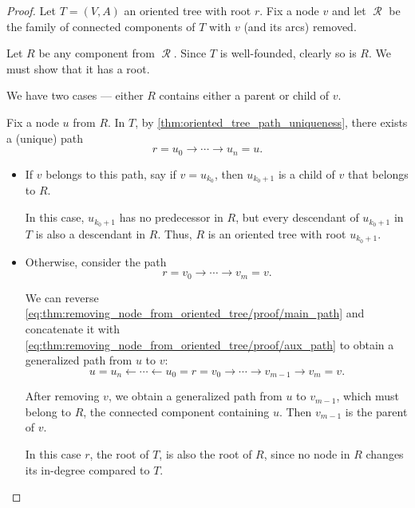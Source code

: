 \begin{proof}
  Let \( T = (V, A) \) an oriented tree with root \( r \). Fix a node \( v \) and let \( \mscrR \) be the family of connected components of \( T \) with \( v \) (and its arcs) removed.

  Let \( R \) be any component from \( \mscrR \). Since \( T \) is well-founded, clearly so is \( R \). We must show that it has a root.

  We have two cases --- either \( R \) contains either a parent or child of \( v \).

  Fix a node \( u \) from \( R \). In \( T \), by \cref{thm:oriented_tree_path_uniqueness}, there exists a (unique) path
  \begin{equation}\label{eq:thm:removing_node_from_oriented_tree/proof/main_path}
    r = u_0 \to \cdots \to u_n = u.
  \end{equation}

  \begin{itemize}
    \item If \( v \) belongs to this path, say if \( v = u_{k_0} \), then \( u_{k_0+1} \) is a child of \( v \) that belongs to \( R \).

    In this case, \( u_{k_0+1} \) has no predecessor in \( R \), but every descendant of \( u_{k_0+1} \) in \( T \) is also a descendant in \( R \). Thus, \( R \) is an oriented tree with root \( u_{k_0+1} \).

    \item Otherwise, consider the path
    \begin{equation}\label{eq:thm:removing_node_from_oriented_tree/proof/aux_path}
      r = v_0 \to \cdots \to v_m = v.
    \end{equation}

    We can reverse \eqref{eq:thm:removing_node_from_oriented_tree/proof/main_path} and concatenate it with \eqref{eq:thm:removing_node_from_oriented_tree/proof/aux_path} to obtain a generalized path from \( u \) to \( v \):
    \begin{equation*}
      u = u_n \leftarrow \cdots \leftarrow u_0 = r = v_0 \to \cdots \to v_{m-1} \to v_m = v.
    \end{equation*}

    After removing \( v \), we obtain a generalized path from \( u \) to \( v_{m-1} \), which must belong to \( R \), the connected component containing \( u \). Then \( v_{m-1} \) is the parent of \( v \).

    In this case \( r \), the root of \( T \), is also the root of \( R \), since no node in \( R \) changes its in-degree compared to \( T \).
  \end{itemize}
\end{proof}

